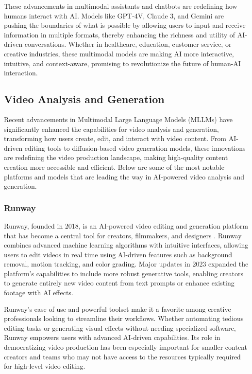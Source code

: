 These advancements in multimodal assistants and chatbots are redefining how humans interact with AI. 
Models like GPT-4V, Claude 3, and Gemini are pushing the boundaries of what is possible by allowing users to input and receive information in multiple formats, thereby enhancing the richness and utility of AI-driven conversations. 
Whether in healthcare, education, customer service, or creative industries, these multimodal models are making AI more interactive, intuitive, and context-aware, promising to revolutionize the future of human-AI interaction.

\subsection{Video Analysis and Generation}

Recent advancements in Multimodal Large Language Models (MLLMs) have significantly enhanced the capabilities for video analysis and generation, transforming how users create, edit, and interact with video content. 
From AI-driven editing tools to diffusion-based video generation models, these innovations are redefining the video production landscape, making high-quality content creation more accessible and efficient. 
Below are some of the most notable platforms and models that are leading the way in AI-powered video analysis and generation.

\subsubsection{Runway}

Runway, founded in 2018, is an AI-powered video editing and generation platform that has become a central tool for creators, filmmakers, and designers \cite{ha2022runway}. 
Runway combines advanced machine learning algorithms with intuitive interfaces, allowing users to edit videos in real time using AI-driven features such as background removal, motion tracking, and color grading. 
Major updates in 2023 expanded the platform's capabilities to include more robust generative tools, enabling creators to generate entirely new video content from text prompts or enhance existing footage with AI effects.

Runway's ease of use and powerful toolset make it a favorite among creative professionals looking to streamline their workflows. 
Whether automating tedious editing tasks or generating visual effects without needing specialized software, Runway empowers users with advanced AI-driven capabilities. 
Its role in democratizing video production has been especially important for smaller content creators and teams who may not have access to the resources typically required for high-level video editing.

